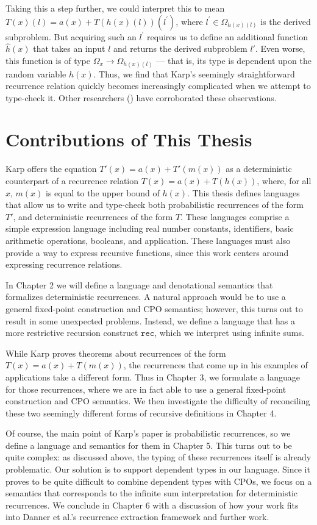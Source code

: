 Taking this a step further, we could interpret this to mean $T(x)(l) = a(x) + T(h(x)(l))(l^\prime)$, where $l^\prime \in 
\Omega_{h(x)(l)}$ is the derived subproblem. But acquiring such an $l^\prime$ requires us to define an 
additional function $\hat{h}(x)$ that takes an input $l$ and returns the derived subproblem $l'$. 
Even worse, this function is of type $\Omega_x \rightarrow \Omega_{h(x)(l)}$ --- that is, its type is dependent 
upon the random variable $h(x)$. Thus, we find that Karp's seemingly straightforward recurrence relation quickly becomes 
increasingly complicated when we attempt to type-check it. Other researchers (\cite{Tassarotti:2017aa}) have corroborated 
these observations. 


\section{Contributions of This Thesis}

Karp offers the equation $T'(x) = a(x) + T'(m(x))$ as a deterministic counterpart of a recurrence relation $T(x) = a(x) + 
T(h(x))$, where, for all $x$, $m(x)$ is equal to the upper bound of $h(x)$. This thesis defines languages that allow
us to write and type-check both probabilistic recurrences of the form $T'$, and deterministic recurrences
of the form $T$. These languages comprise a simple expression language including real number constants, identifiers, basic arithmetic operations, booleans, and application. These languages must also provide
a way to express recursive functions, since this work centers around expressing recurrence relations. 
 
In Chapter 2 we will define a language and denotational semantics that formalizes deterministic recurrences.  A natural 
approach would be to use a general fixed-point construction and CPO semantics; however, this turns out to result in some 
unexpected problems. Instead, we define a language that has a more restrictive recursion construct $\texttt{rec}$, which 
we interpret using infinite sums.  

While Karp proves theorems about recurrences of the form $T(x) = a(x) + T(m(x))$, the recurrences that come up in his 
examples of applications take a different form. Thus in Chapter 3, we formulate a language for those recurrences, where 
we are in fact able to use a general fixed-point construction and CPO semantics.  We then investigate the difficulty of 
reconciling these two seemingly different forms of recursive definitions in Chapter 4. 

 Of course, the main point of Karp's paper is probabilistic recurrences, so we define a language and semantics for 
 them in Chapter 5.  This turns out to be quite complex: as discussed above, the typing of these recurrences itself is 
 already problematic. Our solution is to support dependent types in our language. Since it proves to be quite difficult to 
 combine dependent types with CPOs, we focus on a semantics that corresponds to the infinite sum interpretation for
 deterministic recurrences. We conclude in Chapter 6 with a discussion of how your work fits into Danner et al.'s 
 recurrence extraction framework and further work.
 

